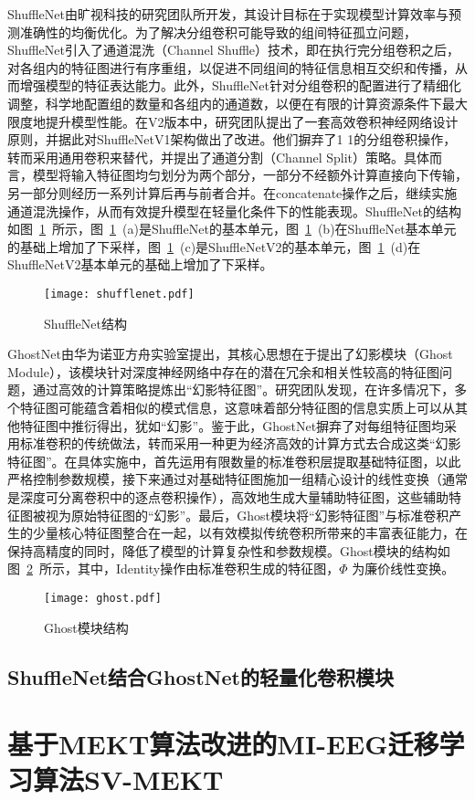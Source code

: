 ShuffleNet\cite{zhang2018shufflenet}由旷视科技的研究团队所开发，其设计目标在于实现模型计算效率与预测准确性的均衡优化。为了解决分组卷积可能导致的组间特征孤立问题，ShuffleNet引入了通道混洗（Channel Shuffle）技术，即在执行完分组卷积之后，对各组内的特征图进行有序重组，以促进不同组间的特征信息相互交织和传播，从而增强模型的特征表达能力。此外，ShuffleNet针对分组卷积的配置进行了精细化调整，科学地配置组的数量和各组内的通道数，以便在有限的计算资源条件下最大限度地提升模型性能。在V2\cite{ma2018shufflenet}版本中，研究团队提出了一套高效卷积神经网络设计原则，并据此对ShuffleNetV1架构做出了改进。他们摒弃了1 \times 1的分组卷积操作，转而采用通用卷积来替代，并提出了通道分割（Channel Split）策略。具体而言，模型将输入特征图均匀划分为两个部分，一部分不经额外计算直接向下传输，另一部分则经历一系列计算后再与前者合并。在concatenate操作之后，继续实施通道混洗操作，从而有效提升模型在轻量化条件下的性能表现。ShuffleNet的结构如图~\ref{fig:shufflenet}~所示，图~\ref{fig:shufflenet}~(a)是ShuffleNet的基本单元，图~\ref{fig:shufflenet}~(b)在ShuffleNet基本单元的基础上增加了下采样，图~\ref{fig:shufflenet}~(c)是ShuffleNetV2的基本单元，图~\ref{fig:shufflenet}~(d)在ShuffleNetV2基本单元的基础上增加了下采样。
\begin{figure}
    \centering
    \texttt{[image: shufflenet.pdf]}
    \caption{ShuffleNet结构}
    \label{fig:shufflenet}
\end{figure}

GhostNet由华为诺亚方舟实验室提出，其核心思想在于提出了幻影模块（Ghost Module）\cite{han2020ghostnet}，该模块针对深度神经网络中存在的潜在冗余和相关性较高的特征图问题，通过高效的计算策略提炼出“幻影特征图”。研究团队发现，在许多情况下，多个特征图可能蕴含着相似的模式信息，这意味着部分特征图的信息实质上可以从其他特征图中推衍得出，犹如“幻影”。鉴于此，GhostNet摒弃了对每组特征图均采用标准卷积的传统做法，转而采用一种更为经济高效的计算方式去合成这类“幻影特征图”。在具体实施中，首先运用有限数量的标准卷积层提取基础特征图，以此严格控制参数规模，接下来通过对基础特征图施加一组精心设计的线性变换（通常是深度可分离卷积中的逐点卷积操作），高效地生成大量辅助特征图，这些辅助特征图被视为原始特征图的“幻影”。最后，Ghost模块将“幻影特征图”与标准卷积产生的少量核心特征图整合在一起，以有效模拟传统卷积所带来的丰富表征能力，在保持高精度的同时，降低了模型的计算复杂性和参数规模。Ghost模块的结构如图~\ref{fig:ghost}~所示，其中，Identity操作由标准卷积生成的特征图，\(\Phi\) 为廉价线性变换。
\begin{figure}
    \centering
    \texttt{[image: ghost.pdf]}
    \caption{Ghost模块结构}
    \label{fig:ghost}
\end{figure}

\subsection{ShuffleNet结合GhostNet的轻量化卷积模块}


\section{基于MEKT算法改进的MI-EEG迁移学习算法SV-MEKT}

